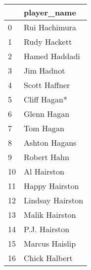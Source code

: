 \begin{tabular}{ll}
\toprule
{} &       player\_name \\
\midrule
0  &     Rui Hachimura \\
1  &      Rudy Hackett \\
2  &     Hamed Haddadi \\
3  &        Jim Hadnot \\
4  &     Scott Haffner \\
5  &      Cliff Hagan* \\
6  &       Glenn Hagan \\
7  &         Tom Hagan \\
8  &     Ashton Hagans \\
9  &       Robert Hahn \\
10 &       Al Hairston \\
11 &    Happy Hairston \\
12 &  Lindsay Hairston \\
13 &    Malik Hairston \\
14 &     P.J. Hairston \\
15 &    Marcus Haislip \\
16 &     Chick Halbert \\
\bottomrule
\end{tabular}
